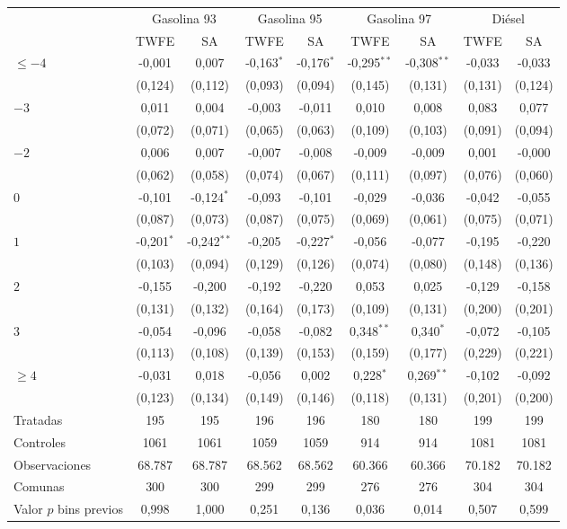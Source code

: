 \begin{tabular}{lcccccccc}
\toprule
 & \multicolumn{2}{c}{Gasolina 93} & \multicolumn{2}{c}{Gasolina 95} & \multicolumn{2}{c}{Gasolina 97} & \multicolumn{2}{c}{Diésel} \\
\cmidrule(lr){2-3} \cmidrule(lr){4-5} \cmidrule(lr){6-7} \cmidrule(lr){8-9}
 & TWFE & SA & TWFE & SA & TWFE & SA & TWFE & SA \\
\midrule
$\leq -4$ & -0{,}001 & 0{,}007 & -0{,}163$^{*}$ & -0{,}176$^{*}$ & -0{,}295$^{**}$ & -0{,}308$^{**}$ & -0{,}033 & -0{,}033 \\
 & (0{,}124) & (0{,}112) & (0{,}093) & (0{,}094) & (0{,}145) & (0{,}131) & (0{,}131) & (0{,}124) \\
$-3$ & 0{,}011 & 0{,}004 & -0{,}003 & -0{,}011 & 0{,}010 & 0{,}008 & 0{,}083 & 0{,}077 \\
 & (0{,}072) & (0{,}071) & (0{,}065) & (0{,}063) & (0{,}109) & (0{,}103) & (0{,}091) & (0{,}094) \\
$-2$ & 0{,}006 & 0{,}007 & -0{,}007 & -0{,}008 & -0{,}009 & -0{,}009 & 0{,}001 & -0{,}000 \\
 & (0{,}062) & (0{,}058) & (0{,}074) & (0{,}067) & (0{,}111) & (0{,}097) & (0{,}076) & (0{,}060) \\
$0$ & -0{,}101 & -0{,}124$^{*}$ & -0{,}093 & -0{,}101 & -0{,}029 & -0{,}036 & -0{,}042 & -0{,}055 \\
 & (0{,}087) & (0{,}073) & (0{,}087) & (0{,}075) & (0{,}069) & (0{,}061) & (0{,}075) & (0{,}071) \\
$1$ & -0{,}201$^{*}$ & -0{,}242$^{**}$ & -0{,}205 & -0{,}227$^{*}$ & -0{,}056 & -0{,}077 & -0{,}195 & -0{,}220 \\
 & (0{,}103) & (0{,}094) & (0{,}129) & (0{,}126) & (0{,}074) & (0{,}080) & (0{,}148) & (0{,}136) \\
$2$ & -0{,}155 & -0{,}200 & -0{,}192 & -0{,}220 & 0{,}053 & 0{,}025 & -0{,}129 & -0{,}158 \\
 & (0{,}131) & (0{,}132) & (0{,}164) & (0{,}173) & (0{,}109) & (0{,}131) & (0{,}200) & (0{,}201) \\
$3$ & -0{,}054 & -0{,}096 & -0{,}058 & -0{,}082 & 0{,}348$^{**}$ & 0{,}340$^{*}$ & -0{,}072 & -0{,}105 \\
 & (0{,}113) & (0{,}108) & (0{,}139) & (0{,}153) & (0{,}159) & (0{,}177) & (0{,}229) & (0{,}221) \\
$\geq 4$ & -0{,}031 & 0{,}018 & -0{,}056 & 0{,}002 & 0{,}228$^{*}$ & 0{,}269$^{**}$ & -0{,}102 & -0{,}092 \\
 & (0{,}123) & (0{,}134) & (0{,}149) & (0{,}146) & (0{,}118) & (0{,}131) & (0{,}201) & (0{,}200) \\
\midrule
Tratadas & 195 & 195 & 196 & 196 & 180 & 180 & 199 & 199 \\
Controles & 1061 & 1061 & 1059 & 1059 & 914 & 914 & 1081 & 1081 \\
Observaciones & 68.787 & 68.787 & 68.562 & 68.562 & 60.366 & 60.366 & 70.182 & 70.182 \\
Comunas & 300 & 300 & 299 & 299 & 276 & 276 & 304 & 304 \\
Valor $p$ bins previos & 0{,}998 & 1{,}000 & 0{,}251 & 0{,}136 & 0{,}036 & 0{,}014 & 0{,}507 & 0{,}599 \\
\bottomrule
\end{tabular}
